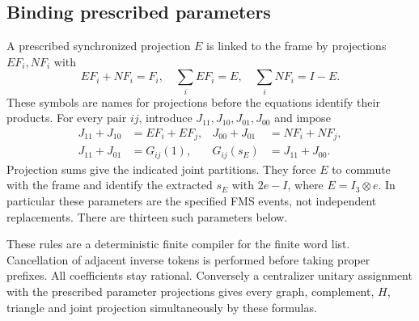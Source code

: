 \subsection{Binding prescribed parameters}
A prescribed synchronized projection $E$ is linked to the frame by projections $EF_i,NF_i$ with
\[
 EF_i+NF_i=F_i,\quad \sum_iEF_i=E,\quad\sum_iNF_i=I-E.
\]
These symbols are names for projections before the equations identify their products. For every pair $ij$, introduce $J_{11},J_{10},J_{01},J_{00}$ and impose
\begin{align*}
 J_{11}+J_{10}&=EF_i+EF_j,&
 J_{00}+J_{01}&=NF_i+NF_j,\\
 J_{11}+J_{01}&=G_{ij}(1),&
 G_{ij}(s_E)&=J_{11}+J_{00}.
\end{align*}
Projection sums give the indicated joint partitions. They force $E$ to commute with the frame and identify the extracted $s_E$ with $2e-I$, where $E=I_3\otimes e$. In particular these parameters are the specified FMS events, not independent replacements. There are thirteen such parameters below.

These rules are a deterministic finite compiler for the finite word list. Cancellation of adjacent inverse tokens is performed before taking proper prefixes. All coefficients stay rational. Conversely a centralizer unitary assignment with the prescribed parameter projections gives every graph, complement, $H$, triangle and joint projection simultaneously by these formulas.
